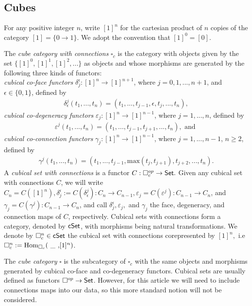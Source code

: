 
\subsection{Cubes}

For any positive integer $n$, write $[1]^n$ for the cartesian product of $n$ copies of the category $[1]=\{0 \to 1\}$. We adopt the convention that $[1]^0=[0]$. 

The \textit{cube category with connections} $\square_c$ is the category with objects given by the set $\{[1]^0, [1]^1, [1]^2,...\}$ as objects and whose morphisms are generated by the following three kinds of functors:
\\
\textit{cubical co-face functors} $\delta^{\epsilon}_{j}: [1]^n \to [1]^{n+1}$, where $j=0,1,...,n+1$, and $\epsilon \in \{0,1\}$, defined by
\begin{eqnarray*}
\delta^{j}_{\epsilon}(t_1,...,t_n)=(t_1,...,t_{j-1},\epsilon,t_j,...,t_n),
\end{eqnarray*}
\textit{cubical co-degeneracy functors} $\varepsilon_{j}: [1]^n \to [1]^{n-1}$, where $j=1,...,n$, defined by
\begin{eqnarray*}
\varepsilon^{j}(t_1,...,t_n)=(t_1,...,t_{j-1},t_{j+1},...,t_n), \text{ and }
\end{eqnarray*}
\textit{cubical co-connection functors} $\gamma_{j}: [1]^n \to [1]^{n-1}$, where $j=1,...,n-1$, $n\geq 2$, defined by
\begin{eqnarray*}
\gamma^{j}(t_1,...,t_n)=(t_1,...,t_{j-1},\text{max}(t_j,t_{j+1}),t_{j+2},...,t_n).
\end{eqnarray*}
A \textit{cubical set with connections} is a functor $C: \square_c^{op} \to \mathsf{Set}.$ Given any cubical set with connections $C$, we will write $C_n= C( [1]^n ), \delta^{\epsilon}_j := C( \delta^{j}_{\epsilon}): C_n \to C_{n-1}, \varepsilon_j=C(\varepsilon^j): C_{n-1} \to C_n$, and $\gamma_j=C(\gamma^j): C_{n-1} \to C_n$, and call $\delta^{\epsilon}_j, \varepsilon_j,$ and $\gamma_j$ the face, degeneracy, and connection maps of $C$, respectively. Cubical sets with connections form a category, denoted by $\mathsf{cSet}$, with morphisms being natural transformations. We denote by $\square_c^n \in \mathsf{cSet}$ the cubical set with connections corepresented by $[1]^n,$ i.e $\square_c^n:= \mathrm{Hom}_{\square_c}(\text{ \_ ,}[1]^n)$. 

\begin{remark} The \textit{cube category} $\square$ is the subcategory of $\square_c$ with the same objects and morphisms generated by cubical co-face and co-degeneracy functors. Cubical sets are usually defined as functors $\square^{op} \to \mathsf{Set}$. However, for this article we will need to include connections maps into our data, so this more standard notion will not be considered. 
\end{remark}





